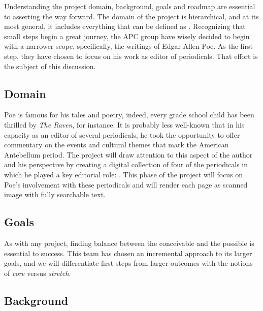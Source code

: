 Understanding the project domain, background, goals and roadmap are essential to asserting the way forward. The domain of the project is hierarchical, and at its most general, it includes everything that can be defined as \emph{\apc}. Recognizing that small steps begin a great journey, the APC group have wisely decided to begin with a narrower scope, specifically, the writings of Edgar Allen Poe. As the first step, they have chosen to focus on his work as editor of periodicals. That effort is the subject of this discussion.

\subsection{Domain}
Poe is famous for his tales and poetry, indeed, every grade school child has been thrilled by \emph{The Raven}, for instance. It is probably less well-known that in his capacity as an editor of several periodicals, he took the opportunity to offer commentary on the events and cultural themes that mark the American Antebellum period. The \projectname project will draw attention to this aspect of the author and his perspective by creating a digital collection of four of the periodicals in which he played a key editorial role: \maglist. This phase of the project will focus on Poe's involvement with these periodicals and will render each page as scanned image with fully searchable text.

\subsection{Goals}
As with any project, finding balance between the conceivable and the possible is essential to success. This team has chosen an incremental approach to its larger goals, and we will differentiate first steps from larger outcomes with the notions of \emph{core} versus \emph{stretch}.


\subsection{Background}




